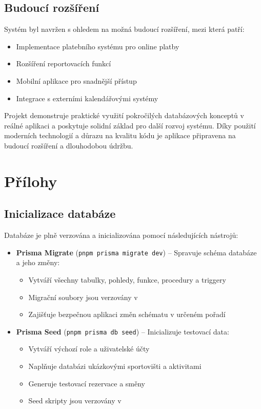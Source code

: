 \documentclass[12pt, a4paper]{article}
\begin{document}
\subsection{Budoucí rozšíření}
Systém byl navržen s ohledem na možná budoucí rozšíření, mezi která patří:
\begin{itemize}
    \item Implementace platebního systému pro online platby
    \item Rozšíření reportovacích funkcí
    \item Mobilní aplikace pro snadnější přístup
    \item Integrace s externími kalendářovými systémy
\end{itemize}

Projekt demonstruje praktické využití pokročilých databázových konceptů v reálné aplikaci a poskytuje solidní základ pro další rozvoj systému. Díky použití moderních technologií a důrazu na kvalitu kódu je aplikace připravena na budoucí rozšíření a dlouhodobou údržbu.

\appendix
\section{Přílohy}
\label{sec:prilohy}

\subsection{Inicializace databáze}
\label{subsec:inicializace}

Databáze je plně verzována a inicializována pomocí následujících nástrojů:

\begin{itemize}
    \item \textbf{Prisma Migrate} (\texttt{pnpm prisma migrate dev}) -- Spravuje schéma databáze a jeho změny:
    \begin{itemize}
        \item Vytváří všechny tabulky, pohledy, funkce, procedury a triggery
        \item Migrační soubory jsou verzovány v 
        \item Zajišťuje bezpečnou aplikaci změn schématu v určeném pořadí
    \end{itemize}
    
    \item \textbf{Prisma Seed} (\texttt{pnpm prisma db seed}) -- Inicializuje testovací data:
    \begin{itemize}
        \item Vytváří výchozí role a uživatelské účty
        \item Naplňuje databázi ukázkovými sportovišti a aktivitami
        \item Generuje testovací rezervace a směny
        \item Seed skripty jsou verzovány v 
    \end{itemize}
\end{itemize}
\end{document}
